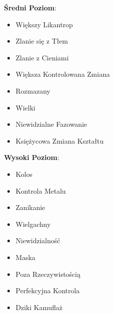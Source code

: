 \textbf{Średni Poziom}:

\begin{itemize}
\item Większy Likantrop
\item Zlanie się z Tłem
\item Zlanie z Cieniami
\item Większa Kontrolowana Zmiana
\item Rozmazany
\item Wielki
\item Niewidzialne Fazowanie
\item Księżycowa Zmiana Kształtu
\end{itemize}
 
\textbf{Wysoki Poziom}:

\begin{itemize}
\item Kolos
\item Kontrola Metalu
\item Zanikanie
\item Wielgachny
\item Niewidzialność
\item Maska
\item Poza Rzeczywistością
\item Perfekcyjna Kontrola
\item Dziki Kamuflaż
\end{itemize}
 